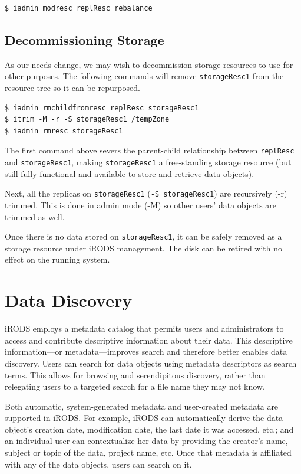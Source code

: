 \documentclass[10pt,oneside]{memoir}
\begin{document}
\begin{lstlisting}
$ iadmin modresc replResc rebalance
\end{lstlisting}

\section{Decommissioning Storage}
As our needs change, we may wish to decommission storage resources to use for other purposes. The following commands will remove \texttt{storageResc1} from the resource tree so it can be repurposed.

\begin{lstlisting}
$ iadmin rmchildfromresc replResc storageResc1
$ itrim -M -r -S storageResc1 /tempZone
$ iadmin rmresc storageResc1
\end{lstlisting}

The first command above severs the parent-child relationship between \texttt{replResc} and \texttt{storageResc1}, making \texttt{storageResc1} a free-standing storage resource (but still fully functional and available to store and retrieve data objects).

Next, all the replicas on \texttt{storageResc1} (\texttt{-S storageResc1}) are recursively (-r) trimmed. This is done in admin mode (-M) so other users' data objects are trimmed as well.

Once there is no data stored on \texttt{storageResc1}, it can be safely removed as a storage resource under iRODS management. The disk can be retired with no effect on the running system.





\chapter{Data Discovery}

iRODS employs a metadata catalog that permits users and administrators to access and contribute descriptive information about their data. This descriptive information---or metadata---improves search and therefore better enables data discovery. Users can search for data objects using metadata descriptors as search terms. This allows for browsing and serendipitous discovery, rather than relegating users to a targeted search for a file name they may not know.

Both automatic, system-generated metadata and user-created metadata are supported in iRODS. For example, iRODS can automatically derive the data object's creation date, modification date, the last date it was accessed, etc.; and an individual user can contextualize her data by providing the creator's name, subject or topic of the data, project name, etc. Once that metadata is affiliated with any of the data objects, users can search on it.
\end{document}
